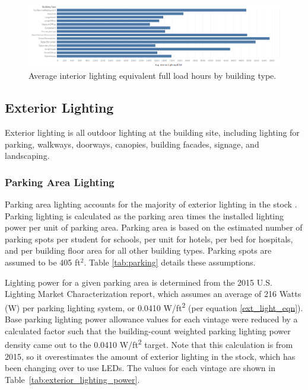 \begin{figure}
    \centering \includegraphics[width=1.0\textwidth]{figures/interior_lighting_eflh.png}
    \caption[Average interior lighting equivalent full load hours by building type]{Average interior lighting equivalent full load hours by building type.}
    \label{fig:interior_lighting_eflh}
\end{figure}

\subsection{Exterior Lighting}
Exterior lighting is all outdoor lighting at the building site, including lighting for parking, walkways, doorways, canopies, building facades, signage, and landscaping.

\subsubsection{Parking Area Lighting}
Parking area lighting accounts for the majority of exterior lighting in the stock \citep{doe2015lmc}. Parking lighting is calculated as the parking area times the installed lighting power per unit of parking area. Parking area is based on the estimated number of parking spots per student for schools, per unit for hotels, per bed for hospitals, and per building floor area for all other building types.  Parking spots are assumed to be 405 ft$^2$. Table \ref{tab:parking} details these assumptions.

Lighting power for a given parking area is determined from the 2015 U.S. Lighting Market Characterization report, which assumes an average of 216 Watts (W) per parking lighting system, or 0.0410 W/ft\textsuperscript{2} (per equation \ref{ext_light_eqn}). Base parking lighting power allowance values for each vintage were reduced by a calculated factor such that the building-count weighted parking lighting power density came out to the 0.0410 W/ft\textsuperscript{2} target.  Note that this calculation is from 2015, so it overestimates the amount of exterior lighting in the stock, which has been changing over to use LEDs. The values for each vintage are shown in Table~\ref{tab:exterior_lighting_power}.

